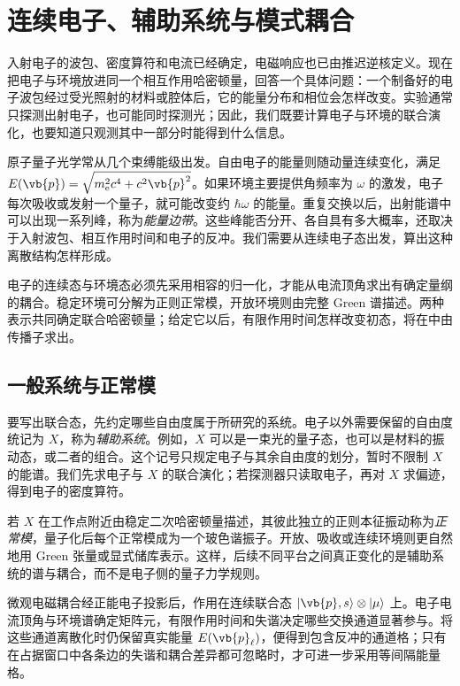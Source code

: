 \chapter{连续电子、辅助系统与模式耦合}\label{chap:general-interaction}

入射电子的波包、密度算符和电流已经确定，电磁响应也已由推迟逆核定义。现在把电子与环境放进同一个相互作用哈密顿量，回答一个具体问题：一个制备好的电子波包经过受光照射的材料或腔体后，它的能量分布和相位会怎样改变。实验通常只探测出射电子，也可能同时探测光；因此，我们既要计算电子与环境的联合演化，也要知道只观测其中一部分时能得到什么信息。\cite{Barwick2009PINEM,Feist2015Nature,Dahan2021Science}

原子量子光学常从几个束缚能级出发。自由电子的能量则随动量连续变化，满足 $E(\vb{p})=\sqrt{m_{\mathrm e}^2c^4+c^2\vb{p}^2}$。如果环境主要提供角频率为 $\omega$ 的激发，电子每次吸收或发射一个量子，就可能改变约 $\hbar\omega$ 的能量。重复交换以后，出射能谱中可以出现一系列峰，称为\emph{能量边带}。这些峰能否分开、各自具有多大概率，还取决于入射波包、相互作用时间和电子的反冲。我们需要从连续电子态出发，算出这种离散结构怎样形成。

电子的连续态与环境态必须先采用相容的归一化，才能从电流顶角求出有确定量纲的耦合。稳定环境可分解为正则正常模，开放环境则由完整 Green 谱描述。两种表示共同确定联合哈密顿量；给定它以后，有限作用时间怎样改变初态，将在中由传播子求出。\cite{GarciaDeAbajoDiGiulio2021,RoquesCarmes2023APR,Ruimy2025Perspective}

\section{一般系统与正常模}

要写出联合态，先约定哪些自由度属于所研究的系统。电子以外需要保留的自由度统记为 $X$，称为\emph{辅助系统}。例如，$X$ 可以是一束光的量子态，也可以是材料的振动态，或二者的组合。这个记号只规定电子与其余自由度的划分，暂时不限制 $X$ 的能谱。我们先求电子与 $X$ 的联合演化；若探测器只读取电子，再对 $X$ 求偏迹，得到电子的密度算符。

若 $X$ 在工作点附近由稳定二次哈密顿量描述，其彼此独立的正则本征振动称为\emph{正常模}，量子化后每个正常模成为一个玻色谐振子。开放、吸收或连续环境则更自然地用 Green 张量或显式储库表示。这样，后续不同平台之间真正变化的是辅助系统的谱与耦合，而不是电子侧的量子力学规则。

\label{fig:general_interaction_continuum_to_recoil_ladder}
微观电磁耦合经正能电子投影后，作用在连续联合态 $|\vb{p},s\rangle\otimes|\mu\rangle$ 上。电子电流顶角与环境谱确定矩阵元，有限作用时间和失谐决定哪些交换通道显著参与。将这些通道离散化时仍保留真实能量 $E(\vb{p}_\ell)$，便得到包含反冲的通道格；只有在占据窗口中各条边的失谐和耦合差异都可忽略时，才可进一步采用等间隔能量格。

